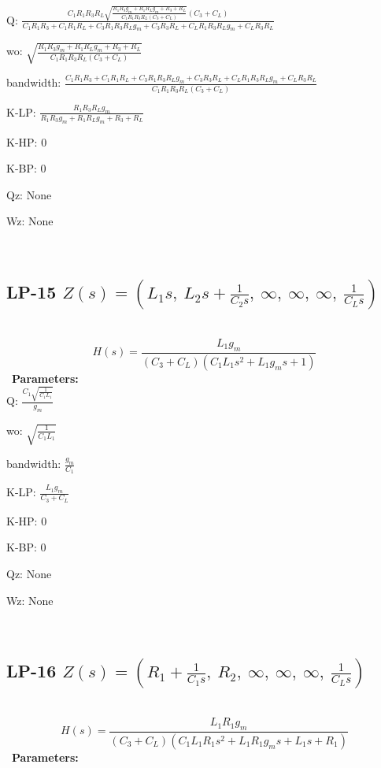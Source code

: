 \documentclass{article}
\begin{document}
Q: $\frac{C_{1} R_{1} R_{3} R_{L} \sqrt{\frac{R_{1} R_{3} g_{m} + R_{1} R_{L} g_{m} + R_{3} + R_{L}}{C_{1} R_{1} R_{3} R_{L} \left(C_{3} + C_{L}\right)}} \left(C_{3} + C_{L}\right)}{C_{1} R_{1} R_{3} + C_{1} R_{1} R_{L} + C_{3} R_{1} R_{3} R_{L} g_{m} + C_{3} R_{3} R_{L} + C_{L} R_{1} R_{3} R_{L} g_{m} + C_{L} R_{3} R_{L}}$\ 

wo: $\sqrt{\frac{R_{1} R_{3} g_{m} + R_{1} R_{L} g_{m} + R_{3} + R_{L}}{C_{1} R_{1} R_{3} R_{L} \left(C_{3} + C_{L}\right)}}$\ 

bandwidth: $\frac{C_{1} R_{1} R_{3} + C_{1} R_{1} R_{L} + C_{3} R_{1} R_{3} R_{L} g_{m} + C_{3} R_{3} R_{L} + C_{L} R_{1} R_{3} R_{L} g_{m} + C_{L} R_{3} R_{L}}{C_{1} R_{1} R_{3} R_{L} \left(C_{3} + C_{L}\right)}$\ 

K-LP: $\frac{R_{1} R_{3} R_{L} g_{m}}{R_{1} R_{3} g_{m} + R_{1} R_{L} g_{m} + R_{3} + R_{L}}$\ 

K-HP: $0$\ 

K-BP: $0$\ 

Qz: $\text{None}$\ 

Wz: $\text{None}$\ 

\ 

\subsection{LP-15 $Z(s) = \left( L_{1} s, \  L_{2} s + \frac{1}{C_{2} s}, \  \infty, \  \infty, \  \infty, \  \frac{1}{C_{L} s}\right)$ } \ 
\textbf{\[H(s) = \frac{L_{1} g_{m}}{\left(C_{3} + C_{L}\right) \left(C_{1} L_{1} s^{2} + L_{1} g_{m} s + 1\right)}\] } \ 
\textbf{Parameters:}\\ 

Q: $\frac{C_{1} \sqrt{\frac{1}{C_{1} L_{1}}}}{g_{m}}$\ 

wo: $\sqrt{\frac{1}{C_{1} L_{1}}}$\ 

bandwidth: $\frac{g_{m}}{C_{1}}$\ 

K-LP: $\frac{L_{1} g_{m}}{C_{3} + C_{L}}$\ 

K-HP: $0$\ 

K-BP: $0$\ 

Qz: $\text{None}$\ 

Wz: $\text{None}$\ 

\ 

\subsection{LP-16 $Z(s) = \left( R_{1} + \frac{1}{C_{1} s}, \  R_{2}, \  \infty, \  \infty, \  \infty, \  \frac{1}{C_{L} s}\right)$ } \ 
\textbf{\[H(s) = \frac{L_{1} R_{1} g_{m}}{\left(C_{3} + C_{L}\right) \left(C_{1} L_{1} R_{1} s^{2} + L_{1} R_{1} g_{m} s + L_{1} s + R_{1}\right)}\] } \ 
\textbf{Parameters:}\\ 
\end{document}
